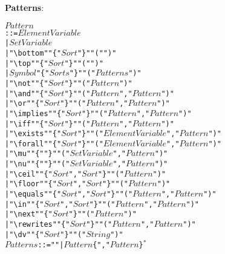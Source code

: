 \documentclass{article}
\theoremstyle{plain}
\theoremstyle{definition}
\newcommand{\String}{\ensuremath{\mathit{String}}}
\newcommand{\SortIt}{\ensuremath{\mathit{Sort}}}
\newcommand{\Sorts}{\ensuremath{\mathit{Sorts}}}
\newcommand{\ElementVariable}{\ensuremath{\mathit{ElementVariable}}}
\newcommand{\SetVariable}{\ensuremath{\mathit{SetVariable}}}
\newcommand{\SymbolId}{\ensuremath{\mathit{Symbol}}}
\newcommand{\PatternIt}{\ensuremath{\mathit{Pattern}}}
\newcommand{\Patterns}{\ensuremath{\mathit{Patterns}}}
\begin{document}
\noindent
\textbf{Patterns}:
\begin{alltt}
  \(\PatternIt\)
    ::= \(\ElementVariable\)
      | \(\SetVariable\)
      | "\textbackslash{}bottom" "\{" \(\SortIt\) "\}" "(" ")"
      | "\textbackslash{}top" "\{" \(\SortIt\) "\}" "(" ")"
      | \(\SymbolId\) "\{" \(\Sorts\) "\}" "(" \(\Patterns\) ")"
      | "\textbackslash{}not" "\{" \(\SortIt\) "\}" "(" \(\PatternIt\) ")"
      | "\textbackslash{}and" "\{" \(\SortIt\) "\}" "(" \(\PatternIt\) "," \(\PatternIt\) ")"
      | "\textbackslash{}or" "\{" \(\SortIt\) "\}" "(" \(\PatternIt\) "," \(\PatternIt\) ")"
      | "\textbackslash{}implies" "\{" \(\SortIt\) "\}" "(" \(\PatternIt\) "," \(\PatternIt\) ")"
      | "\textbackslash{}iff" "\{" \(\SortIt\) "\}" "(" \(\PatternIt\) "," \(\PatternIt\) ")"
      | "\textbackslash{}exists" "\{" \(\SortIt\) "\}" "(" \(\ElementVariable\) "," \(\PatternIt\) ")"
      | "\textbackslash{}forall" "\{" \(\SortIt\) "\}" "(" \(\ElementVariable\) "," \(\PatternIt\) ")"
      | "\textbackslash{}mu" "\{" "\}" "(" \(\SetVariable\) "," \(\PatternIt\) ")"
      | "\textbackslash{}nu" "\{" "\}" "(" \(\SetVariable\) "," \(\PatternIt\) ")"
      | "\textbackslash{}ceil" "\{" \(\SortIt\) "," \(\SortIt\) "\}" "(" \(\PatternIt\) ")"
      | "\textbackslash{}floor" "\{" \(\SortIt\) "," \(\SortIt\) "\}" "(" \(\PatternIt\) ")"
      | "\textbackslash{}equals" "\{" \(\SortIt\) "," \(\SortIt\) "\}" "(" \(\PatternIt\) "," \(\PatternIt\) ")"
      | "\textbackslash{}in" "\{" \(\SortIt\) "," \(\SortIt\) "\}" "(" \(\PatternIt\) "," \(\PatternIt\) ")"
      | "\textbackslash{}next" "\{" \(\SortIt\) "\}" "(" \(\PatternIt\) ")"
      | "\textbackslash{}rewrites" "\{" \(\SortIt\) "\}" "(" \(\PatternIt\) "," \(\PatternIt\) ")"
      | "\textbackslash{}dv" "\{" \(\SortIt\) "\}" "(" \(\String\) ")"
  \(\Patterns\) ::= "" | \(\PatternIt\) \{"," \(\PatternIt\)\}\(^*\)
\end{alltt}
\end{document}
